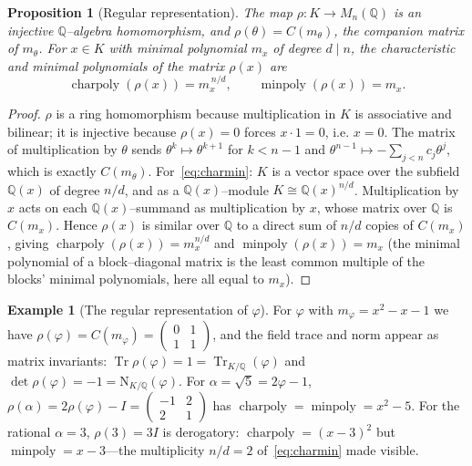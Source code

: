 \documentclass[11pt]{article}
\theoremstyle{plain}
\newtheorem{proposition}[theorem]{Proposition}
\theoremstyle{definition}
\newtheorem{example}[theorem]{Example}
\theoremstyle{remark}
\newcommand{\Q}{\mathbb{Q}}
\newcommand{\K}{K}
\newcommand{\Tr}{\operatorname{Tr}}
\newcommand{\charpoly}{\operatorname{charpoly}}
\newcommand{\minpoly}{\operatorname{minpoly}}
\begin{document}
\begin{proposition}[Regular representation]\label{prop:regrep}
The map $\rho\colon\K\to M_n(\Q)$ is an injective $\Q$--algebra homomorphism, and $\rho(\theta)=C(m_\theta)$,
the companion matrix of $m_\theta$. For $x\in\K$ with minimal polynomial $m_x$ of degree $d\mid n$, the
characteristic and minimal polynomials of the matrix $\rho(x)$ are
\begin{equation}\label{eq:charmin}
  \charpoly(\rho(x)) = m_x^{\,n/d}, \qquad \minpoly(\rho(x)) = m_x .
\end{equation}
\end{proposition}
\begin{proof}
$\rho$ is a ring homomorphism because multiplication in $\K$ is associative and bilinear; it is injective
because $\rho(x)=0$ forces $x\cdot 1=0$, i.e. $x=0$. The matrix of multiplication by $\theta$ sends
$\theta^{k}\mapsto\theta^{k+1}$ for $k<n-1$ and $\theta^{n-1}\mapsto -\sum_{j<n}c_j\theta^{j}$, which is
exactly $C(m_\theta)$. For~\eqref{eq:charmin}: $\K$ is a vector space over the subfield $\Q(x)$ of degree
$n/d$, and as a $\Q(x)$--module $\K\cong \Q(x)^{n/d}$. Multiplication by $x$ acts on each $\Q(x)$--summand as
multiplication by $x$, whose matrix over $\Q$ is $C(m_x)$. Hence $\rho(x)$ is similar over $\Q$ to a direct
sum of $n/d$ copies of $C(m_x)$, giving $\charpoly(\rho(x))=m_x^{n/d}$ and $\minpoly(\rho(x))=m_x$ (the
minimal polynomial of a block--diagonal matrix is the least common multiple of the blocks' minimal
polynomials, here all equal to $m_x$).
\end{proof}

\begin{example}[The regular representation of $\varphi$]\label{ex:regrep}
For $\varphi$ with $m_\varphi=x^2-x-1$ we have
$\rho(\varphi)=C(m_\varphi)=\left(\begin{smallmatrix}0&1\\1&1\end{smallmatrix}\right)$, and the field trace and
norm appear as matrix invariants: $\Tr\rho(\varphi)=1=\Tr_{\K/\Q}(\varphi)$ and
$\det\rho(\varphi)=-1=\mathrm N_{\K/\Q}(\varphi)$. For $\alpha=\sqrt5=2\varphi-1$,
$\rho(\alpha)=2\rho(\varphi)-I=\left(\begin{smallmatrix}-1&2\\2&1\end{smallmatrix}\right)$ has
$\charpoly=\minpoly=x^2-5$. For the rational $\alpha=3$, $\rho(3)=3I$ is derogatory: $\charpoly=(x-3)^2$ but
$\minpoly=x-3$---the multiplicity $n/d=2$ of~\eqref{eq:charmin} made visible.
\end{example}
\end{document}
